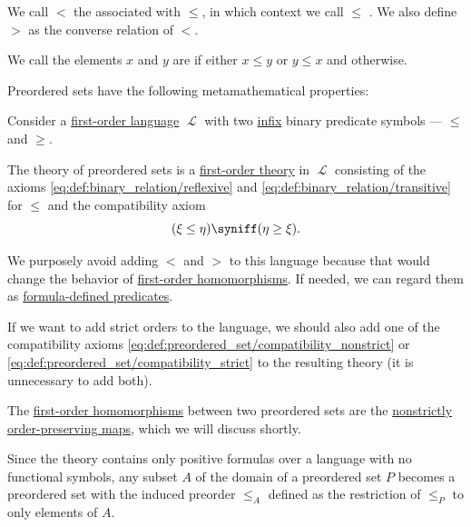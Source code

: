 \begin{definition}
\begin{thmenum}[series=def:preordered_set]
    We call \( < \) the  associated with \( \leq \), in which context we call \( \leq \) . We also define \( > \) as the converse relation of \( < \).

     We call the elements \( x \) and \( y \) are  if either \( x \leq y \) or \( y \leq x \) and  otherwise.
  \end{thmenum}

  Preordered sets have the following metamathematical properties:
  \begin{thmenum}[resume=def:preordered_set]
     Consider a \hyperref[def:first_order_language]{first-order language} \( \mscrL \) with two \hyperref[def:fol_signature/notation]{infix} binary predicate symbols --- \( \leq \) and \( \geq \).

    The theory of preordered sets is a \hyperref[def:fol_theory]{first-order theory} in \( \mscrL \) consisting of the axioms \eqref{eq:def:binary_relation/reflexive} and \eqref{eq:def:binary_relation/transitive} for \( \leq \) and the compatibility axiom
    \begin{equation}\label{eq:def:preordered_set/theory}
      (\xi \leq \eta) \syniff (\eta \geq \xi).
    \end{equation}

    We purposely avoid adding \( < \) and \( > \) to this language because that would change the behavior of \hyperref[def:fol_homomorphism]{first-order homomorphisms}. If needed, we can regard them as \hyperref[con:formula_defined_predicate]{formula-defined predicates}.

    If we want to add strict orders to the language, we should also add one of the compatibility axioms \eqref{eq:def:preordered_set/compatibility_nonstrict} or \eqref{eq:def:preordered_set/compatibility_strict} to the resulting theory (it is unnecessary to add both).

     The \hyperref[def:fol_homomorphism]{first-order homomorphisms} between two preordered sets are the \hyperref[def:order_function/preserving]{nonstrictly order-preserving maps}, which we will discuss shortly.

     Since the theory contains only positive formulas over a language with no functional symbols, any subset \( A \) of the domain of a preordered set \( P \) becomes a preordered set with the induced preorder \( \leq_A \) defined as the restriction of \( \leq_P \) to only elements of \( A \).


\end{thmenum}
\end{definition}
